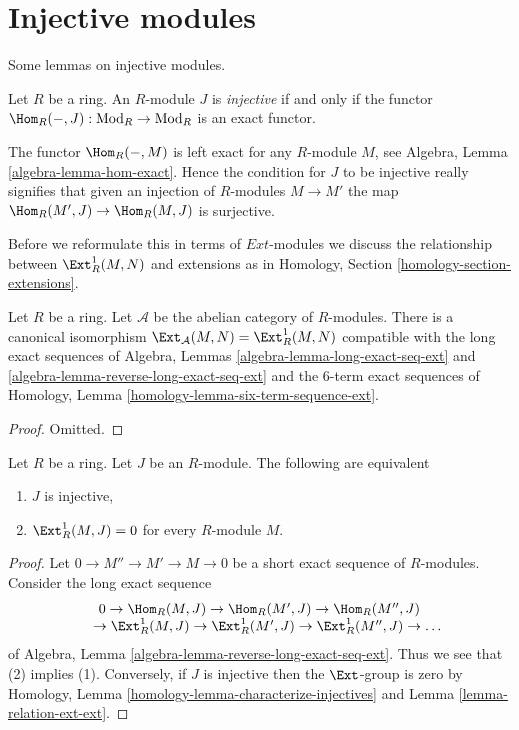 \section{Injective modules}
\label{section-injectives-modules}

\noindent
Some lemmas on injective modules.

\begin{definition}
\label{definition-projective}
Let $R$ be a ring. An $R$-module $J$ is {\it injective} if and only if
the functor $\Hom_R(-, J) : \text{Mod}_R \to \text{Mod}_R$ is
an exact functor.
\end{definition}

\noindent
The functor $\Hom_R(- , M)$ is left exact for any $R$-module $M$, see
Algebra, Lemma \ref{algebra-lemma-hom-exact}.
Hence the condition for $J$ to be injective really signifies that given
an injection of $R$-modules $M \to M'$ the map
$\Hom_R(M', J) \to \Hom_R(M, J)$ is surjective.

\medskip\noindent
Before we reformulate this in terms of ${Ext}$-modules we discuss the
relationship between $\Ext^1_R(M, N)$ and extensions as in
Homology, Section \ref{homology-section-extensions}.

\begin{lemma}
\label{lemma-relation-ext-ext}
Let $R$ be a ring. Let $\mathcal{A}$ be the abelian category of
$R$-modules. There is a canonical isomorphism
$\Ext_\mathcal{A}(M, N) = \Ext^1_R(M, N)$
compatible with the long exact sequences of
Algebra, Lemmas \ref{algebra-lemma-long-exact-seq-ext} and
\ref{algebra-lemma-reverse-long-exact-seq-ext}
and the $6$-term exact sequences of
Homology, Lemma \ref{homology-lemma-six-term-sequence-ext}.
\end{lemma}

\begin{proof}
Omitted.
\end{proof}

\begin{lemma}
\label{lemma-characterize-injective}
Let $R$ be a ring. Let $J$ be an $R$-module.
The following are equivalent
\begin{enumerate}
\item $J$ is injective,
\item $\Ext^1_R(M, J) = 0$ for every $R$-module $M$.
\end{enumerate}
\end{lemma}

\begin{proof}
Let $0 \to M'' \to M' \to M \to 0$ be a short exact sequence of $R$-modules.
Consider the long exact sequence
$$
\begin{matrix}
0
\to \Hom_R(M, J)
\to \Hom_R(M', J)
\to \Hom_R(M'', J)
\\
\phantom{0\ }
\to \Ext^1_R(M, J)
\to \Ext^1_R(M', J)
\to \Ext^1_R(M'', J)
\to \ldots
\end{matrix}
$$
of Algebra, Lemma \ref{algebra-lemma-reverse-long-exact-seq-ext}.
Thus we see that (2) implies (1). Conversely, if $J$ is injective
then the $\Ext$-group is zero by
Homology, Lemma \ref{homology-lemma-characterize-injectives} and
Lemma \ref{lemma-relation-ext-ext}.
\end{proof}

